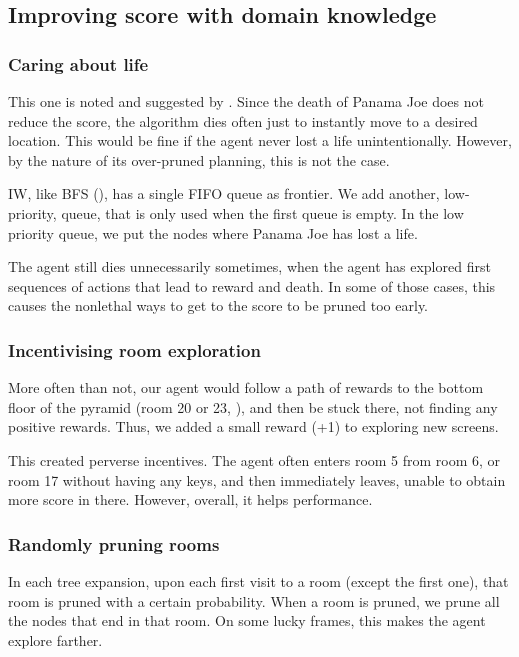 \subsection{Improving score with domain knowledge\label{subsec:domain-explanation}}
\subsubsection{Caring about life}
This one is noted and suggested by \citet{lipovetzky2015classical}. Since the
death of Panama Joe does not reduce the score, the algorithm dies often just to
instantly move to a desired location. This would be fine if the agent never lost
a life unintentionally. However, by the nature of its over-pruned planning, this
is not the case.

\ac{IW}, like \ac{BFS} (), has a single \ac{FIFO} queue as
frontier. We add another, low-priority, queue, that is only used when
the first queue is empty. In the low priority queue, we put the nodes where
Panama Joe has lost a life.

The agent still dies unnecessarily sometimes, when the agent has explored first
sequences of actions that lead to reward and death. In some of those
cases, this causes the nonlethal ways to get to the score to be pruned too early.

\subsubsection{Incentivising room exploration}
More often than not, our agent would follow a path of rewards to the bottom
floor of the pyramid (room 20 or 23, ), and then be
stuck there, not finding any positive rewards. Thus, we added a small reward
(+1) to exploring new screens.

This created perverse incentives. The agent often enters room 5 from room 6, or
room 17 without having any keys, and then immediately leaves, unable to obtain
more score in there. However, overall, it helps performance.

\subsubsection{Randomly pruning rooms}
In each tree expansion, upon each first visit to a room (except the first one),
that room is pruned with a certain probability. When a room is pruned, we prune
all the nodes that end in that room. On some lucky frames, this makes the agent
explore farther.

